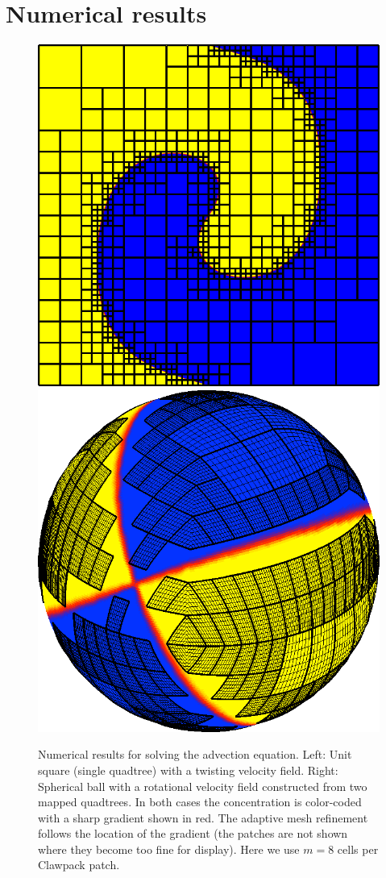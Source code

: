 \documentclass{IOS-Book-Article}     %
\newcommand{\todo}[1]{\textcolor{red}{[TODO: #1]}\xspace}
\newcommand{\clawpack}{{\sc Clawpack}\xspace}
\newcommand{\plotbox}[1]{#1}
\begin{document}





\section{Numerical results}

\begin{figure}
\begin{center}
\plotbox{\includegraphics[width=.4\columnwidth]{quadtree}}
\hspace{.05\columnwidth}
\plotbox{\includegraphics[width=.4\columnwidth]{sphere_plot167}}
\end{center}
\caption{Numerical results for solving the advection equation.  Left:  Unit
square (single quadtree) with a twisting velocity field.  Right: Spherical ball
with a rotational velocity field constructed from two mapped quadtrees.  In
both cases the concentration is color-coded with a sharp gradient shown in red.
The adaptive mesh refinement follows the location of the gradient (the patches
are not shown where they become too fine for display).  Here we use $m = 8$
cells per \clawpack patch.}
\label{fig:results2d}
\end{figure}
\end{document}
